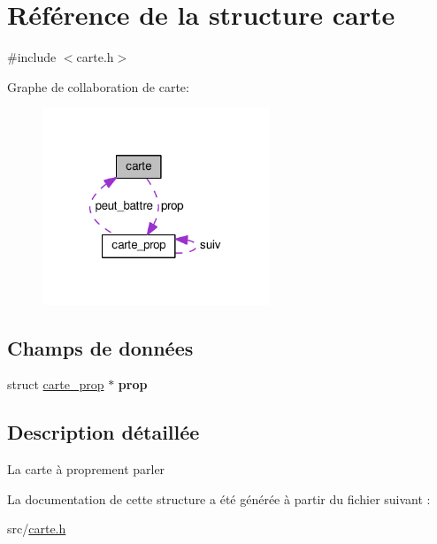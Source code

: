 \hypertarget{structcarte}{}\section{Référence de la structure carte}
\label{structcarte}


{\ttfamily \#include $<$carte.\+h$>$}



Graphe de collaboration de carte\+:\nopagebreak
\begin{figure}[H]
\begin{center}
\leavevmode
\includegraphics[width=193pt]{structcarte__coll__graph}
\end{center}
\end{figure}
\subsection*{Champs de données}
\begin{DoxyCompactItemize}
\item 
struct \hyperlink{structcarte__prop}{carte\+\_\+prop} $\ast$ {\bfseries prop}\hypertarget{structcarte_aa60e889514f9a3a4d33cc74fe0ad2eff}{}\label{structcarte_aa60e889514f9a3a4d33cc74fe0ad2eff}

\end{DoxyCompactItemize}


\subsection{Description détaillée}
La carte à proprement parler 

La documentation de cette structure a été générée à partir du fichier suivant \+:\begin{DoxyCompactItemize}
\item 
src/\hyperlink{carte_8h}{carte.\+h}\end{DoxyCompactItemize}

